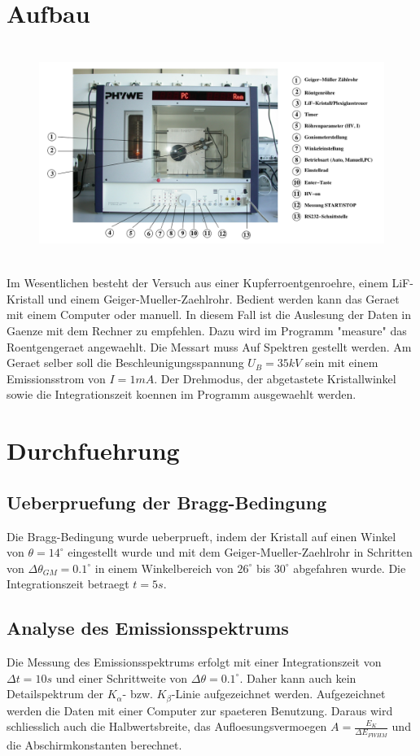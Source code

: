 \section{Aufbau}
\begin{figure}[H]
    \centering
    \captionsetup{justification=centering}
    \includegraphics[height=7cm]{"Aufbau_Roentgen.png"}
    \label{Fig:Aufbau}
\end{figure}
Im Wesentlichen besteht der Versuch aus einer Kupferroentgenroehre, einem LiF-Kristall und einem Geiger-Mueller-Zaehlrohr. Bedient werden kann das Geraet mit einem Computer oder manuell. In diesem Fall ist die Auslesung der Daten in Gaenze mit dem Rechner zu empfehlen. Dazu wird im Programm "measure" das Roentgengeraet angewaehlt. Die Messart muss Auf Spektren gestellt werden. Am Geraet selber soll die Beschleunigungsspannung $U_B=35kV$ sein mit einem Emissionsstrom von $I=1mA$. Der Drehmodus, der abgetastete Kristallwinkel sowie die Integrationszeit koennen im Programm ausgewaehlt werden.
\section{Durchfuehrung}
\subsection{Ueberpruefung der Bragg-Bedingung}
Die Bragg-Bedingung wurde ueberprueft, indem der Kristall auf einen Winkel von $\theta=14^\circ$ eingestellt wurde und mit dem Geiger-Mueller-Zaehlrohr in Schritten von $\Delta\theta_{GM}=0.1^\circ$ in einem Winkelbereich von $26^\circ$ bis $30^\circ$ abgefahren wurde. Die Integrationszeit betraegt $t=5s$.  
\subsection{Analyse des Emissionsspektrums}
Die Messung des Emissionsspektrums erfolgt mit einer Integrationszeit von $\Delta t=10s$ und einer Schrittweite von $\Delta\theta=0.1^\circ$. Daher kann auch kein Detailspektrum der $K_\alpha$- bzw. $K_\beta$-Linie aufgezeichnet werden. Aufgezeichnet werden die Daten mit einer Computer zur spaeteren Benutzung. Daraus wird schliesslich auch die Halbwertsbreite, das Aufloesungsvermoegen $A=\frac{E_K}{\Delta E_{FWHM}}$ und die Abschirmkonstanten berechnet.
